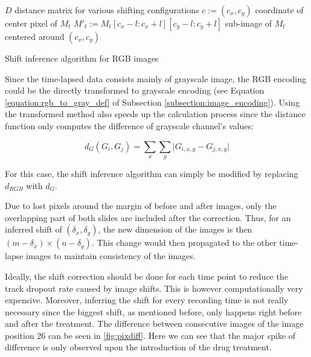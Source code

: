 \documentclass[pdftex,12pt,a4paper]{report}
\begin{document}
\vspace{10mm}

\begin{algorithm}[H]
 $D$ distance matrix for various shifting configurations \;
 $c := (c_x, c_y)$ coordinate of center pixel of $M_t$ \;
 $M'_t  := M_{t}[c_x - l:c_x +l][c_y - l:c_y +l]$ sub-image of $M_t$ centered around $(c_x, c _y)$\;
 \vline
\caption{Shift inference algorithm for RGB images}
\label{algorithm:shift_inference_rgb}
\end{algorithm}

\vspace{10mm}

Since the time-lapsed data consists mainly of grayscale image, the RGB encoding could be the directly transformed to grayscale encoding (see Equation \ref{equation:rgb_to_gray_def} of Subsection \ref{subsection:image_encoding}). Using the transformed method also speeds up the calculation process since the distance function only computes the difference of grayscale channel's values:

$$
d_G(G_i, G_j) =  \sum_{x} \sum_{y} \vert G_{i, x, y} - G_{j, x, y}\vert
$$

For this case, the shift inference algorithm can simply be modified by replacing $d_{RGB}$ with $d_G$.

Due to lost pixels around the margin of before and after images, only the overlapping part of both slides are included after the correction. Thus, for an inferred shift of $(\delta_x, \delta_y)$, the new dimension of the images is then $(m - \delta_x) \times (n - \delta_y)$. This change would then propagated to the other time-lapse images to maintain consistency of the images.

Ideally, the shift correction should be done for each time point to reduce the track dropout rate caused by image shifts. This is however computationally very expensive. Moreover, inferring the shift for every recording time is not really necessary since the biggest shift, as mentioned before, only happens right before and after the treatment. The difference between consecutive images of the image position 26 can be seen in \ref{fig:pixdiff}. Here we can see that the major spike of difference is only observed upon the introduction of the drug treatment.
\end{document}
